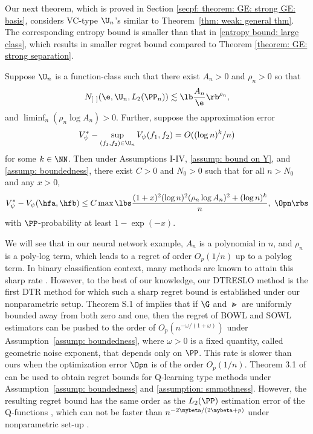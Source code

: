 \documentclass[preprint] {imsart}
\begin{document}
Our next theorem, which is proved in Section \ref{secpf: theorem: GE: strong GE: basis}, considers VC-type  $\U_n$'s similar to  Theorem~\ref{thm: weak: general thm}. The corresponding entropy bound is smaller than that in \eqref{entropy bound: large class}, which results in  smaller  regret bound compared to  Theorem \ref{theorem: GE: strong separation}. 
\begin{theorem}\label{theorem: GE: strong GE: basis}
Suppose $\U_n$  is a function-class such that  there exist $A_n>0$ and $\rho_n>0$ so that
\begin{equation}\label{intheorem: statement: GE: strong GE}
    N_{[\ ]}(\e,\U_n, L_2(\PP_n))\lesssim \lb\frac{A_{n}}{\e}\rb^{\rho_n},
\end{equation}
and 
$\liminf_n(\rho_n\log A_n)>0$.
 Further, suppose
  the approximation error
  \begin{equation}\label{ineq: regret}
      V_{\psi}^*-\sup_{(f_1,f_2)\in\U_n}V_{\psi}(f_1,f_2)=O((\log n)^k/{n})
  \end{equation}
for some $k\in\NN$. 
Then under Assumptions I-IV, \ref{assump: bound on Y}, and \ref{assump: boundedness},  there exist $C>0$ and $N_0>0$ such that for all  $n>N_0$ and any $x>0$,  
\[V_\psi^*-V_\psi(\hfa,\hfb)\leq C \max\lbs \frac{(1+x)^2(\log n)^2(\rho_n\log A_n)^2+(\log n)^k}{n},\ \Opn\rbs\]
 with $\PP$-probability at least $1-\exp(-x)$.
\end{theorem}

We will see that in our neural network example, $A_n$ is a polynomial in $n$, and   $\rho_n$ is a poly-log term, which leads to a regret of order $O_p(1/n)$  up to a polylog term. In binary classification context, many methods are known to attain this sharp rate \citep{massart2006, blanchard2008}. However, to the best of our knowledge, our DTRESLO method is the first DTR method for which such a sharp regret  bound is established under our nonparametric setup. 
Theorem S.1 of \cite{ zhao2015} implies that if $\G$ and $\Gt$ are uniformly bounded away from both zero and one, then  the regret of BOWL and SOWL estimators can be pushed to the order of $O_p(n^{-\omega/(1+\omega)})$ under Assumption~\ref{assump: boundedness}, where $\omega>0$ is a fixed quantity, called geometric noise exponent, that depends only on $\PP$. This rate is slower than ours when the optimization error $\Opn$ is of the order $O_p(1/n)$. Theorem 3.1 of \cite{qian2011} can be used to obtain regret bounds for Q-learning type methods under  Assumption~\ref{assump: boundedness} and \ref{assumption: smmothness}. However, the resulting regret bound has the same order as  the $L_2(\PP)$ estimation error of the Q-functions \citep[cf. equation 3.6 of][]{qian2011}, which can not be faster than $n^{-2\mybeta/(2\mybeta+p)}$  under nonparametric set-up \citep{yang1999minimax}.
\end{document}
